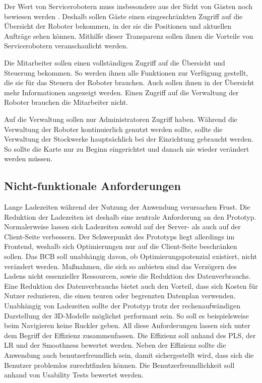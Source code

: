 Der Wert von Servicerobotern muss insbesondere aus der Sicht von Gästen noch bewiesen werden \cite[S.~429]{Paluch2020}. Deshalb sollen Gäste einen eingeschränkten Zugriff auf die Übersicht der Roboter bekommen, in der sie die Positionen und aktuellen Aufträge sehen können. Mithilfe dieser Transparenz sollen ihnen die Vorteile von Servicerobotern veranschaulicht werden.

Die Mitarbeiter sollen einen vollständigen Zugriff auf die Übersicht und Steuerung bekommen. So werden ihnen alle Funktionen zur Verfügung gestellt, die sie für das Steuern der Roboter brauchen. Auch sollen ihnen in der Übersicht mehr Informationen angezeigt werden. Einen Zugriff auf die Verwaltung der Roboter brauchen die Mitarbeiter nicht.

Auf die Verwaltung sollen nur Administratoren Zugriff haben. Während die Verwaltung der Roboter kontinuierlich genutzt werden sollte, sollte die Verwaltung der Stockwerke hauptsächlich bei der Einrichtung gebraucht werden. So sollte die Karte nur zu Beginn eingerichtet und danach nie wieder verändert werden müssen.

\subsection{Nicht-funktionale Anforderungen}
Lange Ladezeiten während der Nutzung der Anwendung verursachen Frust. Die Reduktion der Ladezeiten ist deshalb eine zentrale Anforderung an den Prototyp. Normalerweise lassen sich Ladezeiten sowohl auf der Server- als auch auf der Client-Seite verbessern. Der Schwerpunkt des Prototyps liegt allerdings im Frontend, weshalb sich Optimierungen nur auf die Client-Seite beschränken sollen. Das \ac{BCB} soll unabhängig davon, ob Optimierungspotenzial existiert, nicht verändert werden. Maßnahmen, die sich so anbieten sind das Verzögern des Ladens nicht essenzieller Ressourcen, sowie die Reduktion des Datenverbrauchs. Eine Reduktion des Datenverbrauchs bietet auch den Vorteil, dass sich Kosten für Nutzer reduzieren, die einen teuren oder begrenzten Datenplan verwenden. Unabhängig von Ladezeiten sollte der Prototyp trotz der rechenaufwändigen Darstellung der 3D-Modelle möglichst performant sein. So soll es beispielsweise beim Navigieren keine Ruckler geben. All diese Anforderungen lassen sich unter dem Begriff der Effizienz zusammenfassen. Die Effizienz soll anhand des \ac{PLS}, der \ac{LR} und der Smoothness bewertet werden. Neben der Effizienz sollte die Anwendung auch benutzerfreundlich sein, damit sichergestellt wird, dass sich die Benutzer problemlos zurechtfinden können. Die Benutzerfreundlichkeit soll anhand von Usability Tests bewertet werden.
